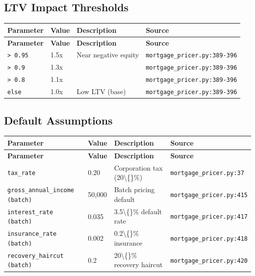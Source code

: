 \documentclass[11pt,a4paper]{article}
\begin{document}
\subsection{LTV Impact Thresholds}

\begin{longtable}{p{4cm}p{4cm}p{5.5cm}p{3.5cm}}
    \toprule
    \textbf{Parameter} & \textbf{Value} & \textbf{Description} & \textbf{Source} \\
    \midrule
    \endfirsthead
    \toprule
    \textbf{Parameter} & \textbf{Value} & \textbf{Description} & \textbf{Source} \\
    \midrule
    \endhead
    \bottomrule
    \endfoot
    \texttt{> 0.95} & 1.5x & Near negative equity & {\scriptsize \texttt{mortgage\_pricer.py:389-396}} \\
    \texttt{> 0.9} & 1.3x &  & {\scriptsize \texttt{mortgage\_pricer.py:389-396}} \\
    \texttt{> 0.8} & 1.1x &  & {\scriptsize \texttt{mortgage\_pricer.py:389-396}} \\
    \texttt{else} & 1.0x & Low LTV (base) & {\scriptsize \texttt{mortgage\_pricer.py:389-396}} \\
\end{longtable}

\subsection{Default Assumptions}

\begin{longtable}{p{4cm}p{4cm}p{5.5cm}p{3.5cm}}
    \toprule
    \textbf{Parameter} & \textbf{Value} & \textbf{Description} & \textbf{Source} \\
    \midrule
    \endfirsthead
    \toprule
    \textbf{Parameter} & \textbf{Value} & \textbf{Description} & \textbf{Source} \\
    \midrule
    \endhead
    \bottomrule
    \endfoot
    \texttt{tax\_rate} & 0.20 & Corporation tax (20\textbackslash\{\}\%) & {\scriptsize \texttt{mortgage\_pricer.py:37}} \\
    \texttt{gross\_annual\_income (batch)} & 50,000 & Batch pricing default & {\scriptsize \texttt{mortgage\_pricer.py:415}} \\
    \texttt{interest\_rate (batch)} & 0.035 & 3.5\textbackslash\{\}\% default rate & {\scriptsize \texttt{mortgage\_pricer.py:417}} \\
    \texttt{insurance\_rate (batch)} & 0.002 & 0.2\textbackslash\{\}\% insurance & {\scriptsize \texttt{mortgage\_pricer.py:418}} \\
    \texttt{recovery\_haircut (batch)} & 0.2 & 20\textbackslash\{\}\% recovery haircut & {\scriptsize \texttt{mortgage\_pricer.py:420}} \\
\end{longtable}
\end{document}
